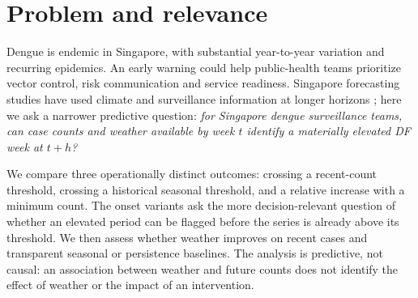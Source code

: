 \section{Problem and relevance}
\label{sec:intro}
Dengue is endemic in Singapore, with substantial year-to-year variation and recurring
epidemics. An early warning could help public-health teams prioritize vector control,
risk communication and service readiness. Singapore forecasting studies have used
climate and surveillance information at longer horizons
\citep{hii2012forecast,shi2016three}; here we ask a narrower predictive question:
\emph{for Singapore dengue surveillance teams, can case counts and weather available by
week $t$ identify a materially elevated DF week at $t+h$?}

We compare three operationally distinct outcomes: crossing a recent-count threshold,
crossing a historical seasonal threshold, and a relative increase with a minimum count.
The onset variants ask the more decision-relevant question of whether an elevated period
can be flagged before the series is already above its threshold. We then assess whether
weather improves on recent cases and transparent seasonal or persistence baselines.
The analysis is predictive, not causal: an association between weather and future counts
does not identify the effect of weather or the impact of an intervention.
